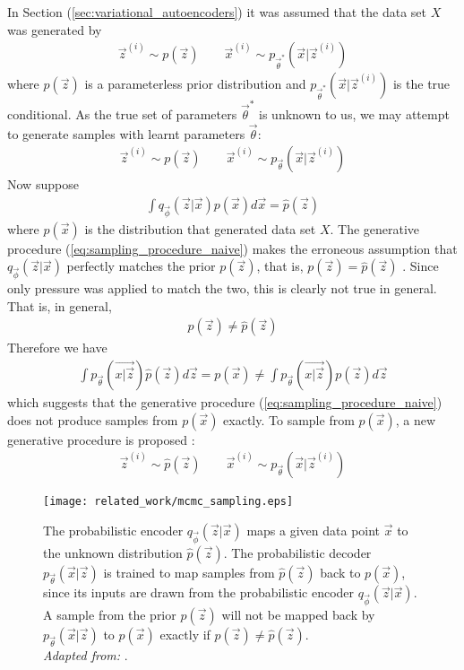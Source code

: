 In Section (\ref{sec:variational_autoencoders}) it was assumed that the data set $X$ was generated by
\begin{align}
\vec{z}^{(i)} \sim p(\vec{z}) \quad\quad \vec{x}^{(i)} \sim p_{\vec{\theta}^*}(\vec{x} | \vec{z}^{(i)})
\end{align}
where $p(\vec{z})$ is a parameterless prior distribution and $p_{\vec{\theta}^*}(\vec{x} | \vec{z}^{(i)})$ is the true conditional. As the true set of parameters $\vec{\theta}^*$ is unknown to us, we may attempt to generate samples with learnt parameters $\vec{\theta}$:
\begin{align}
\vec{z}^{(i)} \sim p(\vec{z}) \quad\quad \vec{x}^{(i)} \sim p_{\vec{\theta}}(\vec{x} | \vec{z}^{(i)})
\label{eq:sampling_procedure_naive}
\end{align}
Now suppose
\begin{align}
\int q_{\vec{\phi}}(\vec{z} | \vec{x}) p(\vec{x})d\vec{x} = \hat{p}(\vec{z})
\end{align}
where $p(\vec{x})$ is the distribution that generated data set $X$. The generative procedure (\ref{eq:sampling_procedure_naive}) makes the erroneous assumption that $q_{\vec{\phi}}(\vec{z} | \vec{x})$ perfectly matches the prior $p(\vec{z})$, that is, $p(\vec{z}) = \hat{p}(\vec{z})$ \cite{Creswell2016}. Since only pressure was applied to match the two, this is clearly not true in general. That is, in general,
\begin{align}
p(\vec{z}) \neq \hat{p}(\vec{z})
\end{align}
Therefore we have
\begin{align}
\int p_{\vec{\theta}}(\vec{x | \vec{z}}) \hat{p}(\vec{z}) d\vec{z} = p(\vec{x}) \neq \int p_{\vec{\theta}}(\vec{x | \vec{z}}) p(\vec{z}) d\vec{z}
\end{align}
which suggests that the generative procedure (\ref{eq:sampling_procedure_naive}) does not produce samples from $p(\vec{x})$ exactly. To sample from $p(\vec{x})$, a new generative procedure is proposed \cite{Creswell2016}:
\begin{align}
\vec{z}^{(i)} \sim \hat{p}(\vec{z}) \quad\quad \vec{x}^{(i)} \sim p_{\vec{\theta}}(\vec{x} | \vec{z}^{(i)})
\label{eq:updated_sampling_mcmc}
\end{align}

\begin{figure}[h!]
\centering
\captionsetup{justification=centering}
\texttt{[image: related\_work/mcmc\_sampling.eps]}
\caption{The probabilistic encoder $q_{\vec{\phi}}(\vec{z} | \vec{x})$ maps a given data point $\vec{x}$ to the unknown distribution $\hat{p}(\vec{z})$. The probabilistic decoder $p_{\vec{\theta}}(\vec{x} | \vec{z})$ is trained to map samples from $\hat{p}(\vec{z})$ back to $p(\vec{x})$, since its inputs are drawn from the probabilistic encoder $q_{\vec{\phi}}(\vec{z} | \vec{x})$. A sample from the prior $p(\vec{z})$ will not be mapped back by $p_{\vec{\theta}}(\vec{x} | \vec{z})$ to $p(\vec{x})$ exactly if $p(\vec{z}) \neq \hat{p}(\vec{z})$.\\ \textit{Adapted from:} \cite{Creswell2016}.}
\label{fig:mcmc_sampling}
\end{figure}

